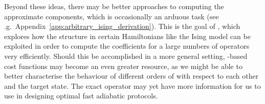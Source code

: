 Beyond these ideas, there may be better approaches to computing the approximate  components, which is occasionally an arduous task (see \@e.g.~Appendix~\ref{app:arbitrary_ising_derivation}). This is the goal of \cite{lawrence_numerical_2024}, which explores how the structure in certain Hamiltonians like the Ising model can be exploited in order to compute the  coefficients for a large numbers of operators very efficiently. Should this be accomplished in a more general setting, -based cost functions may become an even greater resource, as we might be able to better characterise the behaviour of different orders of  with respect to each other and the target state. The exact  operator may yet have more information for us to use in designing optimal fast adiabatic protocols.